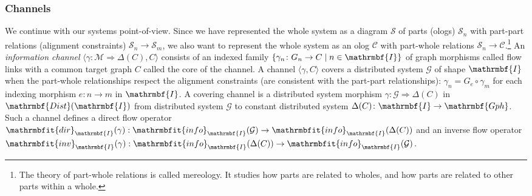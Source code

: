 \documentclass{amsart}
\theoremstyle{remark}
\theoremstyle{definition}
\begin{document}
\subsubsection{Channels}

We continue with our systems point-of-view.
Since we have represented the whole system as a diagram $\mathcal{S}$ of parts (ologs) $\mathcal{S}_{n}$
with part-part relations (alignment constraints) $\mathcal{S}_{n} \rightarrow \mathcal{S}_{m}$,
we also want to represent the whole system as an olog $\mathcal{C}$
with part-whole relations $\mathcal{S}_{n} \rightarrow \mathcal{C}$.\footnote{The theory of part-whole relations is called mereology. 
It studies how parts are related to wholes, and how parts are related to other parts within a whole.}
%
An {\em information channel} 
${\langle{\gamma \colon \mathcal{M} \Rightarrow \Delta(C), C}\rangle}$
consists of an indexed family
$\{ \gamma_{n} \colon G_{n} \rightarrow C \mid n \in \mathrmbf{I} \}$
of graph morphisms called flow links 
with a common target graph $C$ called the core of the channel.
A channel ${\langle{\gamma,C}\rangle}$ covers a distributed system $\mathcal{G}$ of shape $\mathrmbf{I}$
when the part-whole relationships respect the alignment constraints 
(are consistent with the part-part relationships):
$\gamma_{n} = G_{e} \circ \gamma_{m}$ for each indexing morphism $e \colon n \rightarrow m$ in $\mathrmbf{I}$.
%
A covering channel is a 
distributed system morphism
$\gamma \colon \mathcal{G} \Rightarrow 
\Delta(C)$
in $\mathrmbf{Dist}(\mathrmbf{I})$
from distributed system $\mathcal{G}$
to constant distributed system $\Delta(C) \colon \mathrmbf{I} \rightarrow \mathrmbf{Gph}$.
Such a channel defines a direct flow operator
$\mathrmbfit{dir}_{\mathrmbf{I}}(\gamma) :
\mathrmbfit{info}_{\mathrmbf{I}}(\mathcal{G}) \rightarrow \mathrmbfit{info}_{\mathrmbf{I}}(\Delta(C))$
and an inverse flow operator
$\mathrmbfit{inv}_{\mathrmbf{I}}(\gamma) :
\mathrmbfit{info}_{\mathrmbf{I}}(\Delta(C)) \rightarrow \mathrmbfit{info}_{\mathrmbf{I}}(\mathcal{G})$.
\end{document}

